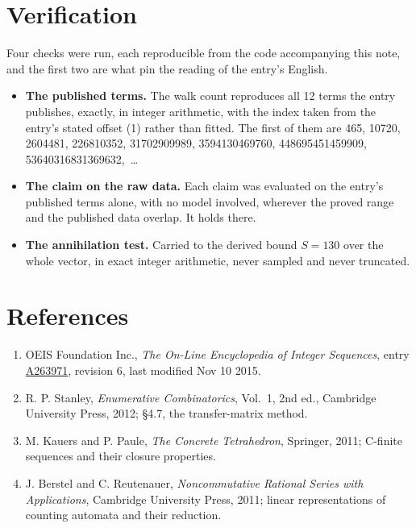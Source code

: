 \documentclass[11pt]{article}
\theoremstyle{definition}
\begin{document}
\section{Verification}

Four checks were run, each reproducible from the code accompanying this note, and the first two are what pin the reading of the entry's English.

\begin{itemize}

\item {\bfseries The published terms.} The walk count reproduces all 12 terms the entry publishes, exactly, in integer arithmetic, with the index taken from the entry's stated offset (1) rather than fitted. The first of them are 465, 10720, 2604481, 226810352, 31702909989, 3594130469760, 448695451459909, 53640316831369632,~\dots

\item {\bfseries The claim on the raw data.} Each claim was evaluated on the entry's published terms alone, with no model involved, wherever the proved range and the published data overlap. It holds there.

\item {\bfseries The annihilation test.} Carried to the derived bound $S = 130$ over the whole vector, in exact integer arithmetic, never sampled and never truncated.

\end{itemize}

\section{References}

\begin{enumerate}

\item OEIS Foundation Inc., \emph{The On-Line Encyclopedia of Integer Sequences}, entry \href{https://oeis.org/A263971}{A263971}, revision 6, last modified Nov 10 2015.

\item R. P. Stanley, \emph{Enumerative Combinatorics}, Vol.~1, 2nd ed., Cambridge University Press, 2012; \S4.7, the transfer-matrix method.

\item M. Kauers and P. Paule, \emph{The Concrete Tetrahedron}, Springer, 2011; C-finite sequences and their closure properties.

\item J. Berstel and C. Reutenauer, \emph{Noncommutative Rational Series with Applications}, Cambridge University Press, 2011; linear representations of counting automata and their reduction.

\end{enumerate}
\end{document}
